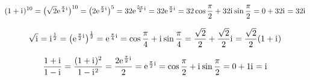 \documentclass[../full]{subfiles}
\begin{document}



    \begin{equation*}
        \paren{1 + \iComplex}^{10}
        = \paren[\big]{\sqrt{2} \eEuler^{\frac{\pi}{4} \iComplex}}^{10}
        = \paren[\big]{2 \eEuler^{\frac{\pi}{2} \iComplex}}^5
        = 32 \eEuler^{\frac{5 \pi}{2} \iComplex}
        = 32 \eEuler^{\frac{\pi}{2} \iComplex}
        = 32 \cos \frac{\pi}{2} + 32 \iComplex \sin \frac{\pi}{2}
        = 0 + 32 \iComplex
        = 32 \iComplex
    \end{equation*}



    \begin{equation*}
        \sqrt{\iComplex}
        = \iComplex^{\frac{1}{2}}
        = \paren[\big]{\eEuler^{\frac{\pi}{2} \iComplex}}^{\frac{1}{2}}
        = \eEuler^{\frac{\pi}{4} \iComplex}
        = \cos \frac{\pi}{4} + \iComplex \sin \frac{\pi}{4}
        = \frac{\sqrt{2}}{2} + \frac{\sqrt{2}}{2} \iComplex
        = \frac{\sqrt{2}}{2} \paren{1 + \iComplex}
    \end{equation*}



    \begin{equation*}
        \frac{1 + \iComplex}{1 - \iComplex}
        = \frac{\paren{1 + \iComplex}^2}{1 - \iComplex^2}
        = \frac{2 \eEuler^{\frac{\pi}{2} \iComplex}}{2}
        = \eEuler^{\frac{\pi}{2} \iComplex}
        = \cos \frac{\pi}{2} + \iComplex \sin \frac{\pi}{2}
        = 0 + 1 \iComplex
        = \iComplex
    \end{equation*}
\end{document}
